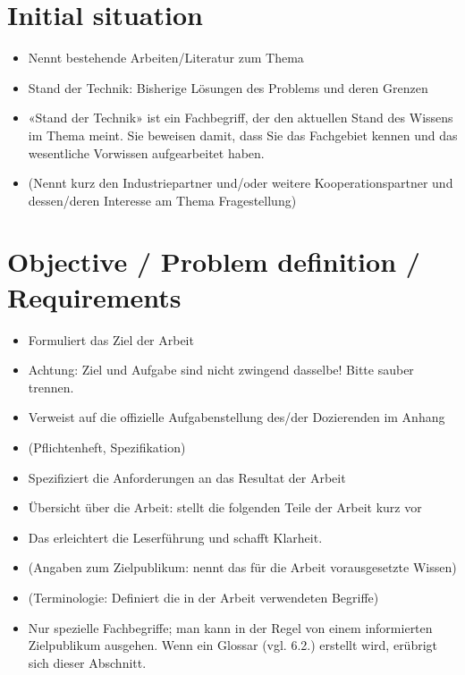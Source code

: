 \section{Initial situation}
\begin{itemize}
    \item Nennt bestehende Arbeiten/Literatur zum Thema
    \item Stand der Technik: Bisherige Lösungen des Problems und deren Grenzen
    \item «Stand der Technik» ist ein Fachbegriff, der den aktuellen Stand des Wissens im Thema meint. Sie beweisen damit, dass Sie das Fachgebiet kennen und das wesentliche Vorwissen aufgearbeitet haben.
    \item (Nennt kurz den Industriepartner und/oder weitere Kooperationspartner und dessen/deren Interesse am Thema Fragestellung)
\end{itemize}

\lipsum[1] \cite{quelle2}

\section{Objective / Problem definition / Requirements}
\begin{itemize}
    \item Formuliert das Ziel der Arbeit
    \item Achtung: Ziel und Aufgabe sind nicht zwingend dasselbe! Bitte sauber trennen.
    \item Verweist auf die offizielle Aufgabenstellung des/der Dozierenden im Anhang
    \item (Pflichtenheft, Spezifikation)
    \item Spezifiziert die Anforderungen an das Resultat der Arbeit
    \item Übersicht über die Arbeit: stellt die folgenden Teile der Arbeit kurz vor
    \item Das erleichtert die Leserführung und schafft Klarheit.
    \item (Angaben zum Zielpublikum: nennt das für die Arbeit vorausgesetzte Wissen)
    \item (Terminologie: Definiert die in der Arbeit verwendeten Begriffe)
    \item Nur spezielle Fachbegriffe; man kann in der Regel von einem informierten Zielpublikum ausgehen.
    Wenn ein Glossar (vgl. 6.2.) erstellt wird, erübrigt sich dieser Abschnitt.
\end{itemize}

